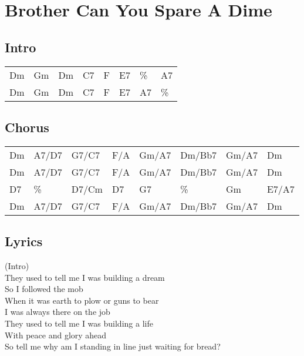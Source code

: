 \section{Brother Can You Spare A Dime}


\subsection*{Intro}


\begin{tabular}{l l l l l l l l}
Dm & Gm & Dm & C7 & F & E7 & \% & A7 \\ 
Dm & Gm & Dm & C7 & F & E7 & A7 & \% \\ 
\end{tabular}


\subsection*{Chorus}


\begin{tabular}{l l l l l l l l}
Dm & A7/D7 & G7/C7 & F/A & Gm/A7 & Dm/Bb7 & Gm/A7 & Dm \\ 
Dm & A7/D7 & G7/C7 & F/A & Gm/A7 & Dm/Bb7 & Gm/A7 & Dm \\ 
D7 & \% & D7/Cm & D7 & G7 & \% & Gm & E7/A7 \\ 
Dm & A7/D7 & G7/C7 & F/A & Gm/A7 & Dm/Bb7 & Gm/A7 & Dm \\ 
\end{tabular}


\subsection*{Lyrics}


(Intro) \\ 
They used to tell me I was building a dream \\ 
So I followed the mob \\ 
When it was earth to plow or guns to bear \\ 
I was always there on the job \\ 
They used to tell me I was building a life \\ 
With peace and glory ahead \\ 
So tell me why am I standing in line just waiting for bread? \\ 

